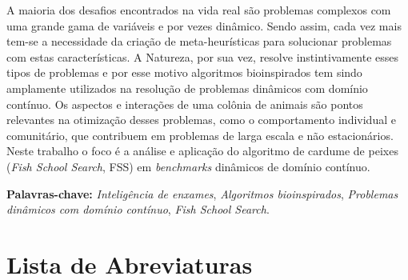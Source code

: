 
\bacharelado {}
\data {\today}



\ttorientador{$ $}
\ttexaminadorum{$ $}
\ttexaminadordois{$ $}

\newpage
\pagestyle{empty}

\maketitle




A maioria dos desafios encontrados na vida real são problemas complexos com uma grande gama de variáveis e por vezes dinâmico. Sendo assim, cada vez mais tem-se a necessidade da criação de meta-heurísticas para solucionar problemas com estas características. A Natureza, por sua vez, resolve instintivamente esses tipos de problemas e por esse motivo algoritmos bioinspirados tem sindo amplamente utilizados na resolução de problemas dinâmicos com domínio contínuo. Os aspectos e interações de uma colônia de animais são pontos relevantes na otimização desses problemas, como o comportamento individual e comunitário, que contribuem em problemas de larga escala e não estacionários. Neste trabalho o foco é a análise e aplicação do algoritmo de cardume de peixes (\textit{Fish School Search}, FSS) em \textit{benchmarks} dinâmicos de domínio contínuo.

\noindent \textbf{Palavras-chave:} \textit{Inteligência de enxames}, \textit{Algoritmos bioinspirados}, \textit{Problemas dinâmicos com domínio contínuo}, \textit{Fish School Search}.

\tableofcontents
\listoffigures
\listoftables
\newpage
\chapter*{Lista de Abreviaturas\hfill} 
\listofsymbols

\newpage
\pagestyle{myheadings}

